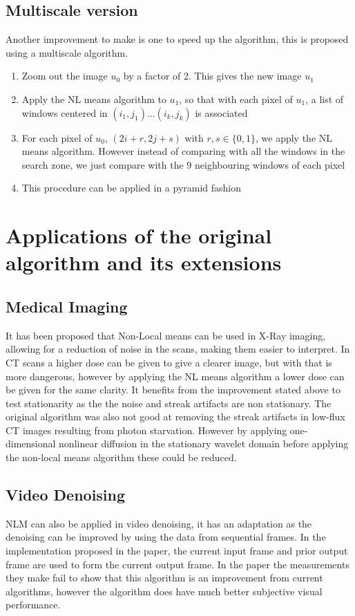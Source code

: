\documentclass[11pt]{article}
\begin{document}
\subsection{Multiscale version}
Another improvement to make is one to speed up the algorithm, this is proposed using a multiscale algorithm.
\begin{enumerate}
	\item Zoom out the image $u_0$ by a factor of 2. This gives the new image $u_1$
	\item Apply the NL means algorithm to $u_1$, so that with each pixel of $u_1$, a list of windows centered in $(i_1,j_1)...(i_k,j_k)$ is associated
	\item For each pixel of $u_0$, $(2i+r,2j+s)$ with $r,s\in \{0,1\}$, we apply the NL means algorithm. However instead of comparing with all the windows in the search zone, we just compare with the 9 neighbouring windows of each pixel
	\item This procedure can be applied in a pyramid fashion
\end{enumerate}
\section{Applications of the original algorithm and its extensions}
\subsection{Medical Imaging}
\cite{zhang_applications_2017} It has been proposed that Non-Local means can be used in X-Ray imaging, allowing for a reduction of noise in the scans, making them easier to interpret. In CT scans a higher dose can be given to give a clearer image, but with that is more dangerous, however by applying the NL means algorithm a lower dose can be given for the same clarity. It benefits from the improvement stated above to test stationarity as the the noise and streak artifacts are non stationary. The original algorithm was also not good at removing the streak artifacts in low-flux CT images resulting from photon starvation. However by applying one-dimensional nonlinear diffusion in the stationary wavelet domain before applying the non-local means algorithm these could be reduced.
\subsection{Video Denoising}
\cite{ali_recursive_2017} NLM can also be applied in video denoising, it has an adaptation as the denoising can be improved by using the data from sequential frames. In the implementation proposed in the paper, the current input frame and prior output frame are used to form the current output frame. In the paper the measurements they make fail to show that this algorithm is an improvement from current algorithms, however the algorithm does have much better subjective visual performance.
\end{document}
